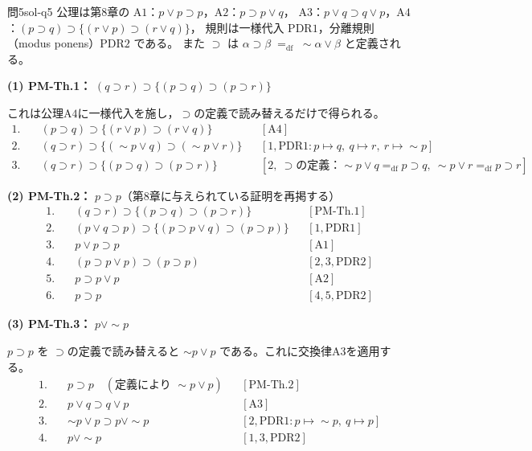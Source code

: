 \documentclass[autodetect-engine,dvi=dvipdfmx,ja=standard]{bxjsarticle}
\begin{document}
\begin{solution}{問5}{sol-q5}
公理は第8章の \(\mathrm{A1}\)：\(p\lor p\supset p\)，\(\mathrm{A2}\)：\(p\supset p\lor q\)，
\(\mathrm{A3}\)：\(p\lor q\supset q\lor p\)，\(\mathrm{A4}\)：\((p\supset q)\supset\{(r\lor p)\supset(r\lor q)\}\)，
規則は一様代入 \(\mathrm{PDR1}\)，分離規則（modus ponens）\(\mathrm{PDR2}\) である。
また \(\supset\) は \(\alpha\supset\beta\;\mathrel{=_{\mathrm{df}}}\;\sim\alpha\lor\beta\) と定義される。

\textbf{(1) PM-Th.1：} \((q\supset r)\supset\{(p\supset q)\supset(p\supset r)\}\)

これは公理\(\mathrm{A4}\)に一様代入を施し，\(\supset\)の定義で読み替えるだけで得られる。
\begin{align*}
  1.\quad & (p\supset q)\supset\{(r\lor p)\supset(r\lor q)\} && [\mathrm{A4}]\\
  2.\quad & (q\supset r)\supset\{(\sim p\lor q)\supset(\sim p\lor r)\}
    && [1,\mathrm{PDR1}: p\mapsto q,\ q\mapsto r,\ r\mapsto\sim p]\\
  3.\quad & (q\supset r)\supset\{(p\supset q)\supset(p\supset r)\}
    && [2,\ \supset\text{の定義：}\sim p\lor q=_{\mathrm{df}}p\supset q,\ \sim p\lor r=_{\mathrm{df}}p\supset r]
\end{align*}

\textbf{(2) PM-Th.2：} \(p\supset p\)（第8章に与えられている証明を再掲する）
\begin{align*}
  1.\quad & (q\supset r)\supset\{(p\supset q)\supset(p\supset r)\} && [\mathrm{PM\text{-}Th.1}]\\
  2.\quad & (p\lor q\supset p)\supset\{(p\supset p\lor q)\supset(p\supset p)\}
    && [1,\mathrm{PDR1}]\\
  3.\quad & p\lor p\supset p && [\mathrm{A1}]\\
  4.\quad & (p\supset p\lor p)\supset(p\supset p) && [2,3,\mathrm{PDR2}]\\
  5.\quad & p\supset p\lor p && [\mathrm{A2}]\\
  6.\quad & p\supset p && [4,5,\mathrm{PDR2}]
\end{align*}

\textbf{(3) PM-Th.3：} \(p\lor\sim p\)

\(p\supset p\) を \(\supset\)の定義で読み替えると \(\sim p\lor p\) である。これに交換律\(\mathrm{A3}\)を適用する。
\begin{align*}
  1.\quad & p\supset p\quad(\text{定義により }\sim p\lor p) && [\mathrm{PM\text{-}Th.2}]\\
  2.\quad & p\lor q\supset q\lor p && [\mathrm{A3}]\\
  3.\quad & \sim p\lor p\supset p\lor\sim p && [2,\mathrm{PDR1}: p\mapsto\sim p,\ q\mapsto p]\\
  4.\quad & p\lor\sim p && [1,3,\mathrm{PDR2}]
\end{align*}


\end{solution}
\end{document}
